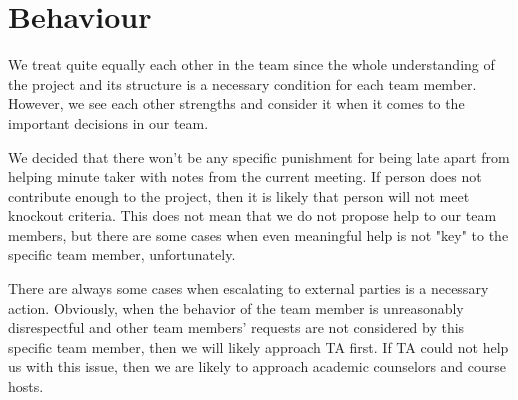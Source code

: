 \section{Behaviour}

We treat quite equally each other in the team since the whole understanding of the project and its structure is a necessary condition for each team member.
However, we see each other strengths and consider it when it comes to the important decisions in our team.

We decided that there won't be any specific punishment for being late apart from helping minute taker with notes from the current meeting.
If person does not contribute enough to the project, then it is likely that person will not meet knockout criteria.
This does not mean that we do not propose help to our team members, but there are some cases when even meaningful help
is not "key" to the specific team member, unfortunately.

There are always some cases when escalating to external parties is a necessary action.
Obviously, when the behavior of the team member is unreasonably disrespectful and other team members'
requests are not considered by this specific team member, then we will likely approach TA first.
If TA could not help us with this issue, then we are likely to approach academic counselors and course hosts.